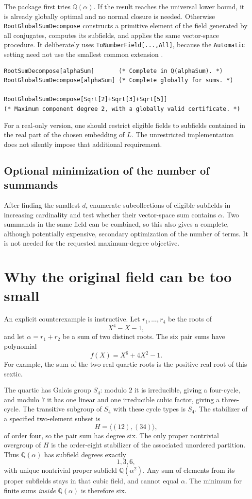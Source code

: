\documentclass[11pt,a4paper]{article}
\newcommand{\Q}{\mathbb Q}
\newcommand{\code}[1]{\texttt{#1}}
\theoremstyle{remark}\newtheorem{remark}[theorem]{Remark}
\begin{document}
The package first tries $\Q(\alpha)$. If the result reaches the universal lower bound, it is already globally optimal and no normal closure is needed. Otherwise \code{RootGlobalSumDecompose} constructs a primitive element of the field generated by all conjugates, computes its subfields, and applies the same vector-space procedure. It deliberately uses \code{ToNumberField[...,All]}, because the \code{Automatic} setting need not use the smallest common extension \cite{tonumberfield}.

\begin{lstlisting}
RootSumDecompose[alphaSum]       (* Complete in Q(alphaSum). *)
RootGlobalSumDecompose[alphaSum] (* Complete globally for sums. *)

RootGlobalSumDecompose[Sqrt[2]+Sqrt[3]+Sqrt[5]]
(* Maximum component degree 2, with a globally valid certificate. *)
\end{lstlisting}
For a real-only version, one should restrict eligible fields to subfields contained in the real part of the chosen embedding of $L$. The unrestricted implementation does not silently impose that additional requirement.

\subsection{Optional minimization of the number of summands}
After finding the smallest $d$, enumerate subcollections of eligible subfields in increasing cardinality and test whether their vector-space sum contains $\alpha$. Two summands in the same field can be combined, so this also gives a complete, although potentially expensive, secondary optimization of the number of terms. It is not needed for the requested maximum-degree objective.

\section{Why the original field can be too small}
\label{sec:outside}
\label{sec:external}
An explicit counterexample is instructive. Let $r_1,\ldots,r_4$ be the roots of
\[
 X^4-X-1,
\]
and let $\alpha=r_1+r_2$ be a sum of two distinct roots. The six pair sums have polynomial
\[
 f(X)=X^6+4X^2-1.
\]
For example, the sum of the two real quartic roots is the positive real root of this sextic.

The quartic has Galois group $S_4$: modulo $2$ it is irreducible, giving a four-cycle, and modulo $7$ it has one linear and one irreducible cubic factor, giving a three-cycle. The transitive subgroup of $S_4$ with these cycle types is $S_4$. The stabilizer of a specified two-element subset is
\[
 H=\langle(12),(34)\rangle,
\]
of order four, so the pair sum has degree six. The only proper nontrivial overgroup of $H$ is the order-eight stabilizer of the associated unordered partition. Thus $\Q(\alpha)$ has subfield degrees exactly
\[
 1,3,6,
\]
with unique nontrivial proper subfield $\Q(\alpha^2)$. Any sum of elements from its proper subfields stays in that cubic field, and cannot equal $\alpha$. The minimum for finite sums \emph{inside} $\Q(\alpha)$ is therefore six.
\end{document}
